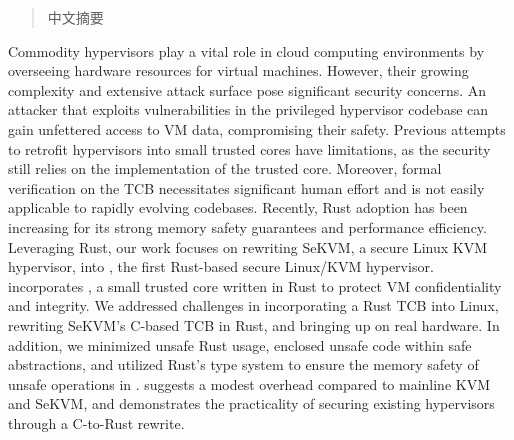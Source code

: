 
\begin{abstract}

中文摘要

\end{abstract}

\begin{abstract*}

Commodity hypervisors play a vital role in cloud computing environments by
overseeing hardware resources for virtual machines. However, their growing
complexity and extensive attack surface pose significant security concerns.
An attacker that exploits vulnerabilities in the privileged hypervisor
codebase can gain unfettered access to VM data, compromising their safety.
Previous attempts to retrofit hypervisors into small trusted cores have
limitations, as the security still relies on the implementation of the trusted
core. Moreover, formal verification on the TCB necessitates significant human
effort and is not easily applicable to rapidly evolving codebases.
Recently, Rust adoption has been increasing for its strong memory safety
guarantees and performance efficiency. Leveraging Rust, our work focuses on
rewriting SeKVM, a secure Linux KVM hypervisor, into \rustsec{}, the first
Rust-based secure Linux/KVM hypervisor. \rustsec{} incorporates
\rustcore{}, a small trusted core written in Rust to protect VM confidentiality
and integrity.
We addressed challenges in incorporating a Rust TCB into Linux, rewriting SeKVM's
C-based TCB in Rust, and bringing up \rustsec{} on real hardware. In addition,
we minimized unsafe Rust usage, enclosed unsafe code within safe abstractions,
and utilized Rust's type system to ensure the memory safety of unsafe
operations in \rustcore{}.
\rustsec{} suggests a modest overhead compared to mainline KVM and SeKVM, and
demonstrates the practicality of securing existing hypervisors through a
C-to-Rust rewrite.

\end{abstract*}
